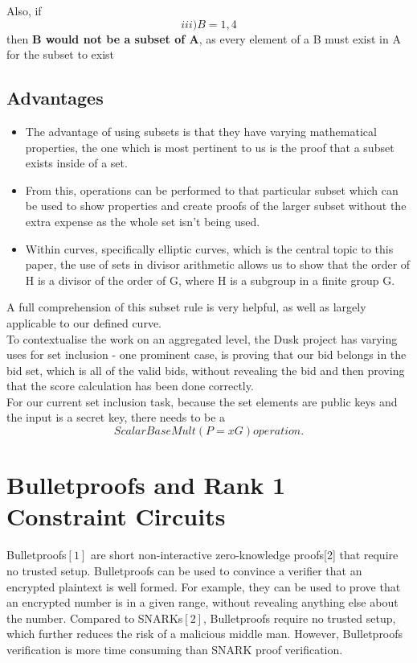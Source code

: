 \documentclass[letterpaper, 10 pt, conference]{ieeeconf}  %
\begin{document}
Also, if $$ iii) B={1,4} $$ then \textbf{B would not be a subset of A}, as every element of a B must exist in A for the subset to exist

\subsection{Advantages}
\begin{itemize}
    \item The advantage of using subsets is that they have varying mathematical properties, the one which is most pertinent to us is the proof that a subset exists inside of a set.
    \item From this, operations can be performed to that particular subset which can be used to show properties and create proofs of the larger subset without the extra expense as the whole set isn’t being used.
    \item Within curves, specifically elliptic curves, which is the central topic to this paper, the use of sets in divisor arithmetic allows us to show that the order of H is a divisor of the order of G, where H is a subgroup in a finite group G.
\end{itemize}
   A full comprehension of this subset rule is very helpful, as well as largely applicable to our defined curve. \\
   To contextualise the work on an aggregated level, the Dusk project has varying uses for set inclusion -  one prominent case, is proving that our bid belongs in the bid set, which is all of the valid bids, without revealing the bid and then proving that the score calculation has been done correctly. \\
   For our current set inclusion task, because the set elements are public keys and the input is a secret key, there needs to be a $$ ScalarBaseMult (P=xG) operation. $$ 
  


\section{Bulletproofs and Rank 1 Constraint Circuits} 
Bulletproofs$[1]$ are short non-interactive zero-knowledge proofs[2] that require no trusted setup. Bulletproofs can be used to convince a verifier that an encrypted plaintext is well formed. For example, they can be used to prove that an encrypted number is in a given range, without revealing anything else about the number. Compared to SNARKs$[2]$, Bulletproofs require no trusted setup, which further reduces the risk of a malicious middle man. However, Bulletproofs verification is more time consuming than SNARK proof verification.\\
\end{document}
